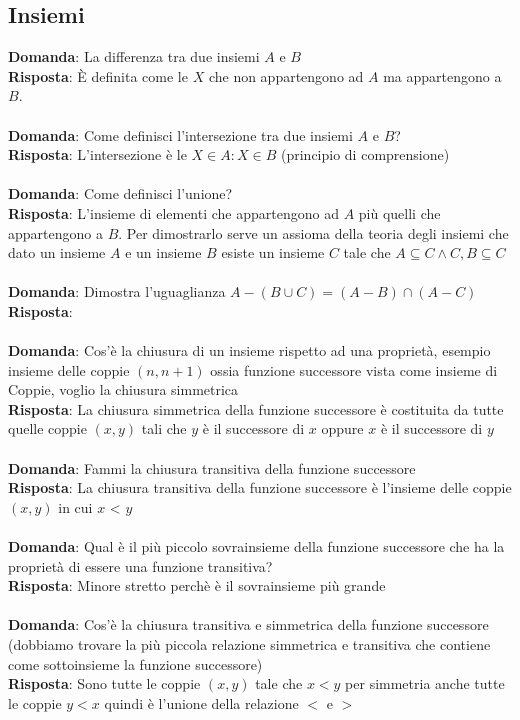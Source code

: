 \documentclass{article}
\begin{document}
\subsection{Insiemi}
\textbf{Domanda}: La differenza tra due insiemi $A$ e $B$  \\
\textbf{Risposta}: È definita come le $X$ che non appartengono ad $A$ ma appartengono a $B$. \\ \\
\textbf{Domanda}: Come definisci l'intersezione tra due insiemi $A$ e $B$? \\
\textbf{Risposta}: L'intersezione è le $X \in A: X \in B$ (principio di comprensione) \\ \\
\textbf{Domanda}: Come definisci l'unione? \\
\textbf{Risposta}: L'insieme di elementi che appartengono ad $A$ più quelli che appartengono a $B$. Per dimostrarlo serve un assioma della teoria degli insiemi che dato un insieme $A$ e un insieme $B$ esiste un insieme $C$ tale che $A \subseteq C \land C,B \subseteq C$ \\ \\
\textbf{Domanda}: Dimostra l'uguaglianza $A - (B \cup C) = (A - B) \cap (A - C)$ \\
\textbf{Risposta}: \\ \\
\textbf{Domanda}: Cos'è la chiusura di un insieme rispetto ad una proprietà, esempio insieme delle coppie $(n, n+1)$ ossia funzione successore vista come insieme di Coppie, voglio la chiusura simmetrica \\
\textbf{Risposta}: La chiusura simmetrica della funzione successore è costituita da tutte quelle coppie $(x,y)$ tali che $y$ è il successore di $x$ oppure $x$ è il successore di $y$\\ \\
\textbf{Domanda}: Fammi la chiusura transitiva della funzione successore \\
\textbf{Risposta}: La chiusura transitiva della funzione successore è l'insieme delle coppie $(x,y)$ in cui $x$ < $y$\\ \\
\textbf{Domanda}: Qual è il più piccolo sovrainsieme della funzione successore che ha la proprietà di essere una funzione transitiva? \\
\textbf{Risposta}: Minore stretto perchè è il sovrainsieme più grande\\ \\
\textbf{Domanda}: Cos'è la chiusura transitiva e simmetrica della funzione successore (dobbiamo trovare la più piccola relazione simmetrica e transitiva che contiene come sottoinsieme la funzione successore)\\
\textbf{Risposta}: Sono tutte le coppie $(x,y)$ tale che $x < y$ per simmetria anche tutte le coppie $y < x$ quindi è l'unione della relazione $<$ e $>$ \\ \\
\end{document}
